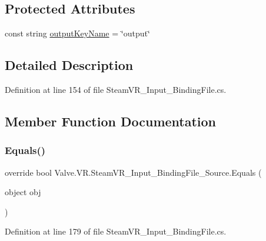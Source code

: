 \subsection*{Protected Attributes}
\begin{DoxyCompactItemize}
\item 
const string \mbox{\hyperlink{class_valve_1_1_v_r_1_1_steam_v_r___input___binding_file___source_a6d80a36c1f28b8cf8f353661dd2db592}{output\+Key\+Name}} = \char`\"{}output\char`\"{}
\end{DoxyCompactItemize}


\subsection{Detailed Description}


Definition at line 154 of file Steam\+V\+R\+\_\+\+Input\+\_\+\+Binding\+File.\+cs.



\subsection{Member Function Documentation}
\mbox{\label{class_valve_1_1_v_r_1_1_steam_v_r___input___binding_file___source_a782bce0af80d4dc3e3e492c9c84361ab}} 
\subsubsection{\texorpdfstring{Equals()}{Equals()}}
{\footnotesize\ttfamily override bool Valve.\+V\+R.\+Steam\+V\+R\+\_\+\+Input\+\_\+\+Binding\+File\+\_\+\+Source.\+Equals (\begin{DoxyParamCaption}\item[{object}]{obj }\end{DoxyParamCaption})}



Definition at line 179 of file Steam\+V\+R\+\_\+\+Input\+\_\+\+Binding\+File.\+cs.

\mbox{\label{class_valve_1_1_v_r_1_1_steam_v_r___input___binding_file___source_a08cd8ab212d6975c344909e8f602b1e5}} 
